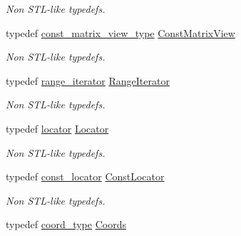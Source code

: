 \begin{DoxyCompactItemize}
\begin{DoxyCompactList}\small\item\em Non S\-T\-L-\/like typedefs. \end{DoxyCompactList}\item 
\hypertarget{class_d_o_1_1_multi_array_a4ac38b3635f1f1ea4016b226401ba9ad}{typedef \hyperlink{class_d_o_1_1_multi_array_a6dcd1d235928f2209e19860122cfe407}{const\-\_\-matrix\-\_\-view\-\_\-type} \hyperlink{class_d_o_1_1_multi_array_a4ac38b3635f1f1ea4016b226401ba9ad}{Const\-Matrix\-View}}\label{class_d_o_1_1_multi_array_a4ac38b3635f1f1ea4016b226401ba9ad}

\begin{DoxyCompactList}\small\item\em Non S\-T\-L-\/like typedefs. \end{DoxyCompactList}\item 
\hypertarget{class_d_o_1_1_multi_array_a9ac449a0d117e31fa565a7f41e02a748}{typedef \hyperlink{class_d_o_1_1_multi_array_a993ff1bd1b7d3a67eeea283b48b1b346}{range\-\_\-iterator} \hyperlink{class_d_o_1_1_multi_array_a9ac449a0d117e31fa565a7f41e02a748}{Range\-Iterator}}\label{class_d_o_1_1_multi_array_a9ac449a0d117e31fa565a7f41e02a748}

\begin{DoxyCompactList}\small\item\em Non S\-T\-L-\/like typedefs. \end{DoxyCompactList}\item 
\hypertarget{class_d_o_1_1_multi_array_ae272211659151c529353c4cf96a980d0}{typedef \hyperlink{class_d_o_1_1_multi_array_ad121376b4c75b70d8dbbf614aa8c238a}{locator} \hyperlink{class_d_o_1_1_multi_array_ae272211659151c529353c4cf96a980d0}{Locator}}\label{class_d_o_1_1_multi_array_ae272211659151c529353c4cf96a980d0}

\begin{DoxyCompactList}\small\item\em Non S\-T\-L-\/like typedefs. \end{DoxyCompactList}\item 
\hypertarget{class_d_o_1_1_multi_array_ac9dad77d8c0422c8e778476ad56a2136}{typedef \hyperlink{class_d_o_1_1_multi_array_a4a50c3fdef274a291b3fc257677bea28}{const\-\_\-locator} \hyperlink{class_d_o_1_1_multi_array_ac9dad77d8c0422c8e778476ad56a2136}{Const\-Locator}}\label{class_d_o_1_1_multi_array_ac9dad77d8c0422c8e778476ad56a2136}

\begin{DoxyCompactList}\small\item\em Non S\-T\-L-\/like typedefs. \end{DoxyCompactList}\item 
\hypertarget{class_d_o_1_1_multi_array_a8c3d64e399e96b23463965538b430170}{typedef \hyperlink{class_d_o_1_1_multi_array_ae4fb477425bbeb20329d300396ac2582}{coord\-\_\-type} \hyperlink{class_d_o_1_1_multi_array_a8c3d64e399e96b23463965538b430170}{Coords}}\label{class_d_o_1_1_multi_array_a8c3d64e399e96b23463965538b430170}


\end{DoxyCompactItemize}
